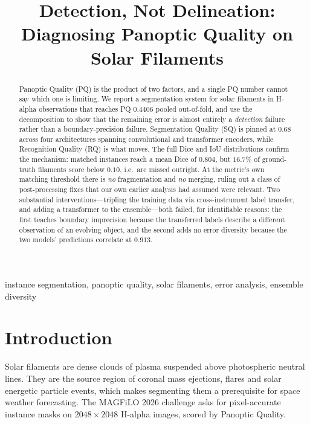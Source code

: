 \documentclass[conference]{IEEEtran}
\begin{document}
\title{Detection, Not Delineation:\\
Diagnosing Panoptic Quality on Solar Filaments}

\author{
}

\maketitle

\begin{abstract}
Panoptic Quality (PQ) is the product of two factors, and a single PQ number
cannot say which one is limiting. We report a segmentation system for solar
filaments in H-alpha observations that reaches PQ $0.4406$ pooled out-of-fold,
and use the decomposition to show that the remaining error is almost entirely a
\emph{detection} failure rather than a boundary-precision failure. Segmentation
Quality (SQ) is pinned at $0.68$ across four architectures spanning
convolutional and transformer encoders, while Recognition Quality (RQ) is what
moves. The full Dice and IoU distributions confirm the mechanism: matched
instances reach a mean Dice of $0.804$, but $16.7\%$ of ground-truth filaments
score below $0.10$, i.e.\ are missed outright. At the metric's own matching
threshold there is \emph{no} fragmentation and \emph{no} merging, ruling out a
class of post-processing fixes that our own earlier analysis had assumed were
relevant. Two substantial interventions---tripling the training data via
cross-instrument label transfer, and adding a transformer to the
ensemble---both failed, for identifiable reasons: the first teaches boundary
imprecision because the transferred labels describe a different observation of
an evolving object, and the second adds no error diversity because the two
models' predictions correlate at $0.913$.
\end{abstract}

\begin{IEEEkeywords}
instance segmentation, panoptic quality, solar filaments, error analysis,
ensemble diversity
\end{IEEEkeywords}

\section{Introduction}

Solar filaments are dense clouds of plasma suspended above photospheric neutral
lines. They are the source region of coronal mass ejections, flares and solar
energetic particle events, which makes segmenting them a prerequisite for space
weather forecasting. The MAGFiLO 2026 challenge asks for pixel-accurate instance
masks on $2048\times2048$ H-alpha images, scored by Panoptic Quality.
\end{document}

